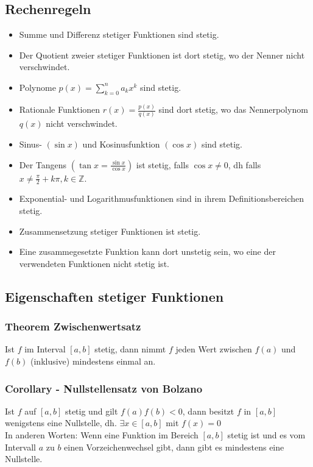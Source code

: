\documentclass[../main.tex]{subfiles}
\begin{document}
\subsection{Rechenregeln}
\begin{itemize}
    \item Summe und Differenz stetiger Funktionen sind stetig.
    \item Der Quotient zweier stetiger Funktionen ist dort stetig, wo der Nenner nicht verschwindet.
    \item Polynome $p(x) = \sum\limits_{k=0}^n a_kx^k$ sind stetig.
    \item Rationale Funktionen $r(x) = \frac{p(x)}{q(x)}$ sind dort stetig, wo das Nennerpolynom $q(x)$ nicht verschwindet.
    \item Sinus- $(\sin x)$ und Kosinusfunktion $(\cos x)$ sind stetig.
    \item Der Tangens $(\tan x = \frac{\sin x}{\cos x})$ ist stetig, falls $\cos x \neq 0$, dh falls $x \neq \frac{\pi}{2} + k \pi, k \in \mathbb{Z}$.
    \item Exponential- und Logarithmusfunktionen sind in ihrem Definitionsbereichen stetig.
    \item Zusammensetzung stetiger Funktionen ist stetig.
    \item Eine zusammegesetzte Funktion kann dort unstetig sein, wo eine der verwendeten Funktionen nicht stetig ist.
\end{itemize}

\subsection{Eigenschaften stetiger Funktionen}
\subsubsection{Theorem Zwischenwertsatz}
Ist $f$ im Interval $[a,b]$ stetig, dann nimmt $f$ jeden Wert zwischen $f(a)$ und $f(b)$ (inklusive) mindestens einmal an.
\subsubsection{Corollary - Nullstellensatz von Bolzano}
Ist $f$ auf $[a,b]$ stetig und gilt $f(a)f(b) < 0$, dann besitzt $f$ in $[a,b]$ wenigstens eine Nullstelle, dh. $\exists x \in [a,b]$ mit $f(x)=0$ \\
In anderen Worten: Wenn eine Funktion im Bereich $[a,b]$ stetig ist und es vom Intervall $a$ zu $b$ einen Vorzeichenwechsel gibt, dann gibt es mindestens eine Nullstelle.
\end{document}
